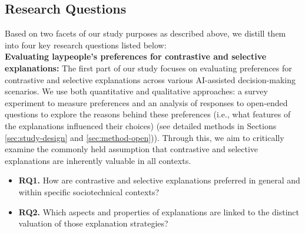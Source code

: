 \subsection{Research Questions}\label{sec:rqs}
Based on two facets of our study purposes as described above, we distill them into four key research questions listed below: \\

{\bf Evaluating laypeople's preferences for contrastive and selective explanations:} The first part of our study focuses on evaluating preferences for contrastive and selective explanations across various AI-assisted decision-making scenarios. We use both quantitative and qualitative approaches: a survey experiment to measure preferences and an analysis of responses to open-ended questions to explore the reasons behind these preferences (i.e., what features of the explanations influenced their choices) (see detailed methods in Sections \ref{sec:study-design} and \ref{sec:method-open})). Through this, we aim to critically examine the commonly held assumption that contrastive and selective explanations are inherently valuable in all contexts.
\begin{itemize}
    \item \textbf{RQ1.} How are contrastive and selective explanations preferred in general and within specific sociotechnical contexts?
    \item \textbf{RQ2.} Which aspects and properties of explanations are linked to the distinct valuation of those explanation strategies?
\end{itemize}

